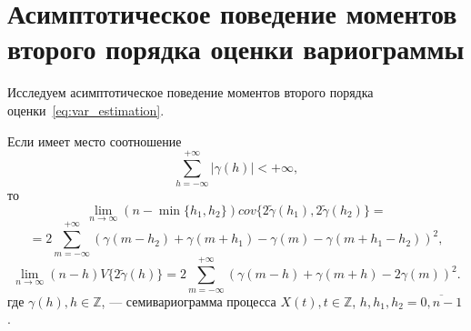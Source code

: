 \vspace{1em}

\section{Асимптотическое поведение моментов второго порядка оценки вариограммы} %
\label{sec:new_section}

Исследуем асимптотическое поведение моментов второго порядка оценки~\eqref{eq:var_estimation}.

\begin{Theorem}
	Если имеет место соотношение
	\begin{equation}
	\label{eq:var_abs}
		\sum_{h = -\infty}^{+\infty} \vert \gamma(h) \vert < +\infty,
	\end{equation}
	то
	\begin{equation*}
		\lim_{n \to \infty} (n - \min\{ h_1, h_2 \}) cov\{ 2 \tilde{\gamma}(h_1), 2 \tilde{\gamma}(h_2) \} = %
	\end{equation*}
	\begin{equation}
	\label{eq:asymptotic_cov}
		= 2 \sum_{m = -\infty}^{+\infty} (\gamma(m - h_2) + \gamma(m + h_1) - \gamma(m) - \gamma(m + h_1 - h_2))^2,
	\end{equation}
	\begin{equation}
	\label{eq:asymptotic_var}
		\lim_{n \to \infty} (n - h) V\{ 2 \tilde{\gamma}(h) \} = 2 \sum_{m = -\infty}^{+\infty} (\gamma(m - h) + \gamma(m + h) - 2 \gamma(m))^2.
	\end{equation}
	где $ \gamma(h), h \in \mathbb{Z} $, --- семивариограмма процесса $ X(t), t \in \mathbb{Z}$, $ h, h_1, h_2 = \overline{0, n - 1} $.
\end{Theorem}
